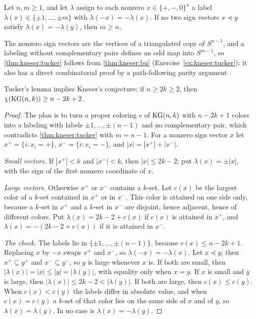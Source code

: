 \begin{refsection}
\begin{theorem}\label{thm:kneser:tucker}
Let $n,m\ge1$, and let $\lambda$ assign to each nonzero $x\in\{+,-,0\}^n$ a label $\lambda(x)\in\{\pm1,\dots,\pm m\}$ with $\lambda(-x)=-\lambda(x)$. If no two sign vectors $x\preceq y$ satisfy $\lambda(x)=-\lambda(y)$, then $m\ge n$.
\end{theorem}

The nonzero sign vectors are the vertices of a triangulated copy of $S^{n-1}$, and a labeling without complementary pairs defines an odd map into $S^{m-1}$, so \cref{thm:kneser:tucker} follows from \cref{thm:kneser:bu} (Exercise~\ref{ex:kneser:tucker}); it also has a direct combinatorial proof by a path-following parity argument \parencite[Chapter~2]{Matousek2003}.

\begin{theorem}\label{thm:kneser:matousek}
Tucker's lemma implies Kneser's conjecture: if $n\ge2k\ge2$, then $\chi(\mathrm{KG}(n,k))\ge n-2k+2$.
\end{theorem}

\begin{proof}
The plan is to turn a proper coloring $c$ of $\mathrm{KG}(n,k)$ with $n-2k+1$ colors into a labeling with labels $\pm1,\dots,\pm(n-1)$ and no complementary pair, which contradicts \cref{thm:kneser:tucker} with $m=n-1$. For a nonzero sign vector $x$ let $x^+=\{i:x_i=+\}$, $x^-=\{i:x_i=-\}$, and $|x|=|x^+|+|x^-|$.

\emph{Small vectors.} If $|x^+|<k$ and $|x^-|<k$, then $|x|\le2k-2$; put $\lambda(x)=\pm|x|$, with the sign of the first nonzero coordinate of $x$.

\emph{Large vectors.} Otherwise $x^+$ or $x^-$ contains a $k$-set. Let $c(x)$ be the largest color of a $k$-set contained in $x^+$ or in $x^-$. This color is attained on one side only, because a $k$-set in $x^+$ and a $k$-set in $x^-$ are disjoint, hence adjacent, hence of different colors. Put $\lambda(x)=2k-2+c(x)$ if $c(x)$ is attained in $x^+$, and $\lambda(x)=-(2k-2+c(x))$ if it is attained in $x^-$.

\emph{The check.} The labels lie in $\{\pm1,\dots,\pm(n-1)\}$, because $c(x)\le n-2k+1$. Replacing $x$ by $-x$ swaps $x^+$ and $x^-$, so $\lambda(-x)=-\lambda(x)$. Let $x\preceq y$; then $x^+\subseteq y^+$ and $x^-\subseteq y^-$, so $y$ is large whenever $x$ is. If both are small, then $|\lambda(x)|=|x|\le|y|=|\lambda(y)|$, with equality only when $x=y$. If $x$ is small and $y$ is large, then $|\lambda(x)|\le2k-2<|\lambda(y)|$. If both are large, then $c(x)\le c(y)$. When $c(x)<c(y)$ the labels differ in absolute value, and when $c(x)=c(y)$ a $k$-set of that color lies on the same side of $x$ and of $y$, so $\lambda(x)=\lambda(y)$. In no case is $\lambda(x)=-\lambda(y)$.
\end{proof}


\end{refsection}
